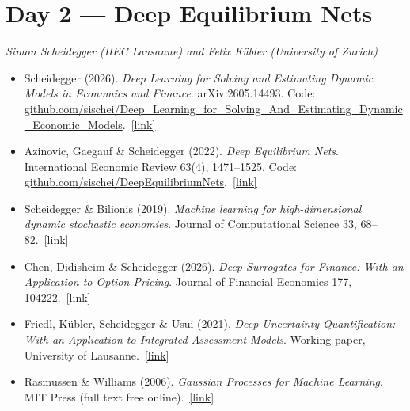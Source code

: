 \documentclass[11pt]{article}
\newcommand{\reading}[5]{%
  \item #1. \textit{#2}. #3.\ \href{#4}{[link]}%
}
\begin{document}
\section*{Day 2 --- Deep Equilibrium Nets}
\textit{Simon Scheidegger (HEC Lausanne) and Felix Kübler (University of Zurich)}
\smallskip

\begin{itemize}
  \reading{Scheidegger (2026)}{Deep Learning for Solving and Estimating Dynamic Models in Economics and Finance}{arXiv:2605.14493. Code: \href{https://github.com/sischei/Deep_Learning_for_Solving_And_Estimating_Dynamic_Economic_Models}{github.com/\allowbreak sischei/\allowbreak Deep\_\allowbreak Learning\_\allowbreak for\_\allowbreak Solving\_\allowbreak And\_\allowbreak Estimating\_\allowbreak Dynamic\_\allowbreak Economic\_\allowbreak Models}}{https://arxiv.org/abs/2605.14493}{}
  \reading{Azinovic, Gaegauf \& Scheidegger (2022)}{Deep Equilibrium Nets}{International Economic Review 63(4), 1471--1525. Code: \href{https://github.com/sischei/DeepEquilibriumNets}{github.com/\allowbreak sischei/\allowbreak DeepEquilibriumNets}}{https://doi.org/10.1111/iere.12575}{The flagship paper the DEQN lectures are built on: neural networks trained unsupervised to satisfy equilibrium conditions along simulated paths, with heterogeneity, uncertainty, and occasionally binding constraints. Reproduction code at \href{https://github.com/sischei/DeepEquilibriumNets}{github.com/sischei/DeepEquilibriumNets}.}
  \reading{Scheidegger \& Bilionis (2019)}{Machine learning for high-dimensional dynamic stochastic economies}{Journal of Computational Science 33, 68--82}{https://doi.org/10.1016/j.jocs.2019.03.004}{Combines Gaussian-process regression with active subspaces to solve models up to roughly 500 dimensions; bridges the deep-learning and Gaussian-process halves of Day 2.}
  \reading{Chen, Didisheim \& Scheidegger (2026)}{Deep Surrogates for Finance: With an Application to Option Pricing}{Journal of Financial Economics 177, 104222}{https://doi.org/10.1016/j.jfineco.2025.104222}{Underpins the ``deep surrogate models and uncertainty quantification'' lecture: neural-network surrogates approximate expensive structural models to accelerate estimation by orders of magnitude.}
  \reading{Friedl, Kübler, Scheidegger \& Usui (2021)}{Deep Uncertainty Quantification: With an Application to Integrated Assessment Models}{Working paper, University of Lausanne}{https://sites.google.com/site/simonscheidegger/working-papers}{The ``deep uncertainty quantification'' counterpart to the equilibrium-net methods: a deep-learning global solver paired with a Gaussian-process surrogate to perform parametric uncertainty quantification in stochastic dynamic models, illustrated on climate integrated-assessment models.}
  \reading{Rasmussen \& Williams (2006)}{Gaussian Processes for Machine Learning}{MIT Press (full text free online)}{https://gaussianprocess.org/gpml/}{The canonical reference for Kübler's Gaussian-processes and Bayesian numerical-methods lecture; focus on Chapters 2--5 (GP regression, covariance functions, hyperparameter learning).}
\end{itemize}
\end{document}
